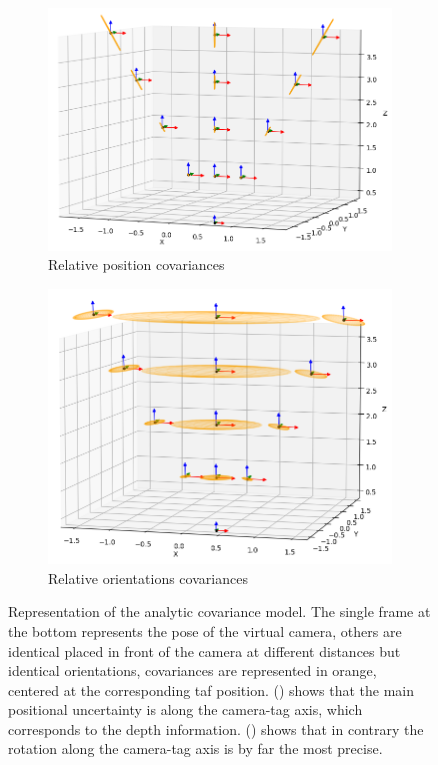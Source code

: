 \begin{figure}[h]
    \centering
    \begin{subfigure}{.49\linewidth}
        \centering
        \includegraphics[width=\textwidth]{figures/apriltag_cov_posi.png}
        \caption{Relative position covariances \label{fig:apriltag_cov_posi}}
    \end{subfigure}%
    \hfill
    \begin{subfigure}{.49\linewidth}
        \centering
        \includegraphics[width=\textwidth]{figures/apriltag_cov_orientation.png}
        \caption{Relative orientations covariances \label{fig:apriltag_cov_orientation}}
    \end{subfigure}%
    \caption{Representation of the analytic covariance model. The single frame at the bottom represents the pose of the virtual camera, others are identical 
    \apriltags placed in front of the camera at different distances but identical orientations, covariances are represented in orange, centered at the corresponding taf position.
    () shows that the main positional uncertainty is along the camera-tag axis, which corresponds to the depth information. 
    () shows that in contrary the rotation along the camera-tag axis is by far the most precise.}
    \label{fig:apriltag_cov}
\end{figure}

